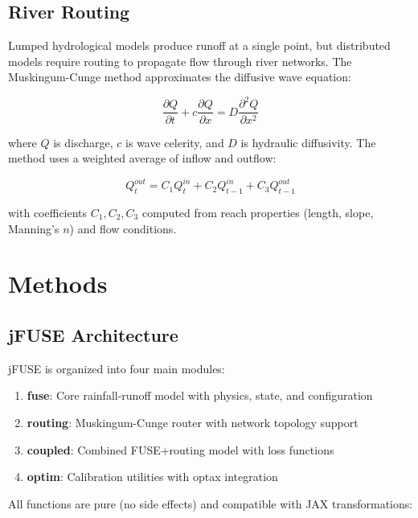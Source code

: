 \documentclass[11pt,a4paper]{article}
\begin{document}
\subsection{River Routing}

Lumped hydrological models produce runoff at a single point, but distributed models require routing to propagate flow through river networks. The Muskingum-Cunge method \citep{cunge1969} approximates the diffusive wave equation:

\begin{equation}
    \frac{\partial Q}{\partial t} + c\frac{\partial Q}{\partial x} = D\frac{\partial^2 Q}{\partial x^2}
\end{equation}

where $Q$ is discharge, $c$ is wave celerity, and $D$ is hydraulic diffusivity. The method uses a weighted average of inflow and outflow:

\begin{equation}
    Q_t^{out} = C_1 Q_t^{in} + C_2 Q_{t-1}^{in} + C_3 Q_{t-1}^{out}
\end{equation}

with coefficients $C_1, C_2, C_3$ computed from reach properties (length, slope, Manning's $n$) and flow conditions.

\section{Methods}

\subsection{jFUSE Architecture}

jFUSE is organized into four main modules:

\begin{enumerate}
    \item \textbf{fuse}: Core rainfall-runoff model with physics, state, and configuration
    \item \textbf{routing}: Muskingum-Cunge router with network topology support
    \item \textbf{coupled}: Combined FUSE+routing model with loss functions
    \item \textbf{optim}: Calibration utilities with optax integration
\end{enumerate}

All functions are pure (no side effects) and compatible with JAX transformations:
\end{document}
